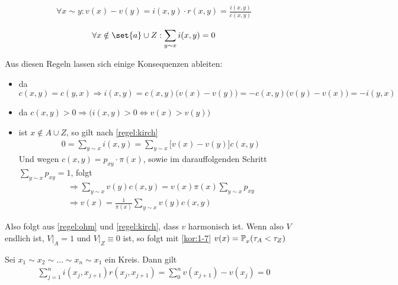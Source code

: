 \begin{regel}
	\label{regel:ohm}
	\begin{align}
		\forall x\sim y: v(x)-v(y) = i(x,y) \cdot r(x,y) = \frac{i(x,y)}{c(x,y)}
	\end{align}
\end{regel}

\begin{regel}
	\label{regel:kirch}
	\begin{align}
		\forall x \notin \set{a} \cup Z: \sum\limits_{y \sim x} i(x,y) = 0
	\end{align}
\end{regel}

Aus diesen Regeln lassen sich einige Konsequenzen ableiten:
\begin{itemize}
	\item da $c(x,y) = c(y,x) \Rightarrow i(x,y) = c(x,y)\big(v(x) -v(y)\big) = -c(x,y)\big(v(y)- v(x)\big) = - i(y,x)$
	\item da $c(x,y) > 0 \Rightarrow \Big({i(x,y) > 0 \Leftrightarrow v(x) > v(y)}\Big)$
	\item ist $x \notin A \cup Z$, so gilt nach \ref{regel:kirch} 
		\begin{align}
			0 = \sum\limits_{y \sim x} i(x,y) = \sum\limits_{y \sim x} \big[v(x)-v(y)\big]c(x,y)
		\end{align}
		Und wegen $c(x,y) = p_{xy} \cdot \pi(x)$, sowie im darauffolgenden Schritt $\sum\limits_{y \sim x} p_{xy} = 1$, folgt
		\begin{align}
			\Rightarrow \sum\limits_{y\sim x} v(y)c(x,y) = v(x)\pi(x) \sum\limits_{y \sim x} p_{xy} \\
			\Rightarrow v(x) = \frac{1}{\pi(x)} \sum\limits_{y \sim x} v(y) c(x,y)
		\end{align}
\end{itemize}
Also folgt aus \ref{regel:ohm} und \ref{regel:kirch}, dass $v$ harmonisch ist. Wenn also $V$ endlich ist, $V|_A = 1$ und $V|_Z \equiv 0$ ist, so folgt mit \ref{kor:1-7} $v(x) = \prop{\tau_A < \tau_Z}[][x]$

\begin{korollar}
	Sei $x_1 \sim x_2 \sim \dots \sim x_n \sim x_1$ ein Kreis. Dann gilt 
	\begin{align}
		\sum\limits_{j=1}^{n}i(x_j,x_{j+1})r(x_j,x_{j+1}) = \sum\limits_{0}^{n}v(x_{j+1}) - v(x_j) = 0
	\end{align}
\end{korollar}

